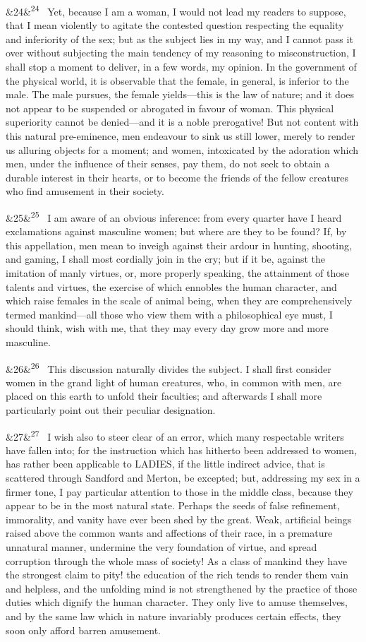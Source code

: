 \documentclass[12pt]{article}
\newcommand{\para}[1][]{\par\noindent\ifx&#1&\else\textsuperscript{\footnotesize #1}~\fi}
\begin{document}
\para[24] Yet, because I am a woman, I would not lead my readers to suppose, that I mean violently to agitate the contested question respecting the equality and inferiority of the sex; but as the subject lies in my way, and I cannot pass it over without subjecting the main tendency of my reasoning to misconstruction, I shall stop a moment to deliver, in a few words, my opinion. In the government of the physical world, it is observable that the female, in general, is inferior to the male. The male pursues, the female yields---this is the law of nature; and it does not appear to be suspended or abrogated in favour of woman. This physical superiority cannot be denied---and it is a noble prerogative! But not content with this natural pre-eminence, men endeavour to sink us still lower, merely to render us alluring objects for a moment; and women, intoxicated by the adoration which men, under the influence of their senses, pay them, do not seek to obtain a durable interest in their hearts, or to become the friends of the fellow creatures who find amusement in their society.

\para[25] I am aware of an obvious inference: from every quarter have I heard exclamations against masculine women; but where are they to be found? If, by this appellation, men mean to inveigh against their ardour in hunting, shooting, and gaming, I shall most cordially join in the cry; but if it be, against the imitation of manly virtues, or, more properly speaking, the attainment of those talents and virtues, the exercise of which ennobles the human character, and which raise females in the scale of animal being, when they are comprehensively termed mankind---all those who view them with a philosophical eye must, I should think, wish with me, that they may every day grow more and more masculine.

\para[26] This discussion naturally divides the subject. I shall first consider women in the grand light of human creatures, who, in common with men, are placed on this earth to unfold their faculties; and afterwards I shall more particularly point out their peculiar designation.

\para[27] I wish also to steer clear of an error, which many respectable writers have fallen into; for the instruction which has hitherto been addressed to women, has rather been applicable to LADIES, if the little indirect advice, that is scattered through Sandford and Merton, be excepted; but, addressing my sex in a firmer tone, I pay particular attention to those in the middle class, because they appear to be in the most natural state. Perhaps the seeds of false refinement, immorality, and vanity have ever been shed by the great. Weak, artificial beings raised above the common wants and affections of their race, in a premature unnatural manner, undermine the very foundation of virtue, and spread corruption through the whole mass of society! As a class of mankind they have the strongest claim to pity! the education of the rich tends to render them vain and helpless, and the unfolding mind is not strengthened by the practice of those duties which dignify the human character. They only live to amuse themselves, and by the same law which in nature invariably produces certain effects, they soon only afford barren amusement.
\end{document}
